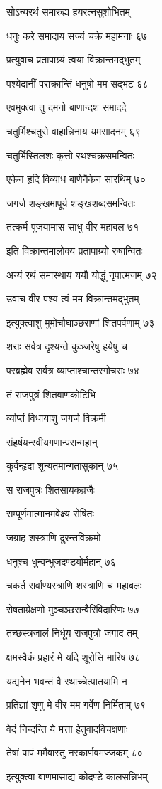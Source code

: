 सोऽन्यरथं समारुह्य हयरत्नसुशोभितम्

धनुः करे समादाय सज्यं चक्रे महामनाः ६७

प्रत्युवाच प्रतापाग्र्यं त्वया विक्रान्तमद्भुतम्

पश्येदानीं पराक्रान्तिं धनुषो मम सद्भट ६८

एवमुक्त्वा तु दमनो बाणान्दश समाददे

चतुर्भिश्चतुरो वाहान्निनाय यमसादनम् ६९

चतुर्भिस्तिलशः कृत्तो रथश्चक्रसमन्वितः

एकेन हृदि विव्याध बाणेनैकेन सारथिम् ७०

जगर्ज शङ्खमापूर्य शङ्खशब्दसमन्वितः

तत्कर्म पूजयामास साधु वीर महाबल ७१

इति विक्रान्तमालोक्य प्रतापाग्र्यो रुषान्वितः

अन्यं रथं समास्थाय ययौ योद्धुं नृपात्मजम् ७२

उवाच वीर पश्य त्वं मम विक्रान्तमद्भुतम्

इत्युक्त्वाशु मुमोचौघाञ्छराणां शितपर्वणाम् ७३

शराः सर्वत्र दृश्यन्ते कुञ्जरेषु हयेषु च

परब्रह्मेव सर्वत्र व्याप्ताश्चान्तरगोचराः ७४

तं राजपुत्रं शितबाणकोटिभि -

र्व्याप्तं विधायाशु जगर्ज विक्रमी

संहर्षयन्स्वीयगणान्परान्महान्

कुर्वन्हृदा शून्यतमान्गतासुकान् ७५

स राजपुत्रः शितसायकव्रजैः

सम्पूर्णमात्मानमवेक्ष्य रोषितः

जग्राह शस्त्राणि दुरन्तविक्रमो

धनुश्च धुन्वन्भुजदण्डयोर्महान् ७६

चकर्त सर्वाण्यस्त्राणि शस्त्राणि च महाबलः

रोषताम्रेक्षणो मुञ्चञ्छरान्वैरिविदारिणः ७७

तच्छस्त्रजालं निर्धूय राजपुत्रो जगाद तम्

क्षमस्वैकं प्रहारं मे यदि शूरोसि मारिष ७८

यद्यनेन भवन्तं वै रथाच्चेत्पातयामि न

प्रतिज्ञां शृणु मे वीर मम गर्वेण निर्मिताम् ७९

वेदं निन्दन्ति ये मत्ता हेतुवादविचक्षणाः

तेषां पापं ममैवास्तु नरकार्णवमज्जकम् ८०

इत्युक्त्वा बाणमासाद्य कोदण्डे कालसन्निभम्

